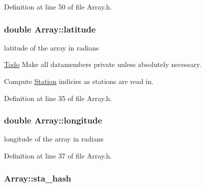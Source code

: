 Definition at line 50 of file Array.h.

\hypertarget{classArray_a3d0a097d6c7d27ab0ba7b72a9b2223e1}{
\subsubsection[{latitude}]{\setlength{\rightskip}{0pt plus 5cm}double {\bf Array::latitude}}}
\label{classArray_a3d0a097d6c7d27ab0ba7b72a9b2223e1}


latitude of the array in radians 

\begin{Desc}
\item[\hyperlink{todo__todo000002}{Todo}]Make all datamembers private unless absolutely necessary. 

Compute \hyperlink{classStation}{Station} indicies as stations are read in. \end{Desc}


Definition at line 35 of file Array.h.

\hypertarget{classArray_a7b0af12d6151bd9bb25e91145b79fb74}{
\subsubsection[{longitude}]{\setlength{\rightskip}{0pt plus 5cm}double {\bf Array::longitude}}}
\label{classArray_a7b0af12d6151bd9bb25e91145b79fb74}


longitude of the array in radians 



Definition at line 37 of file Array.h.

\hypertarget{classArray_ad832ad5752132c3a290989998c3561c1}{
\subsubsection[{sta\_\-hash}]{ {\bf Array::sta\_\-hash}}}
\label{classArray_ad832ad5752132c3a290989998c3561c1}


